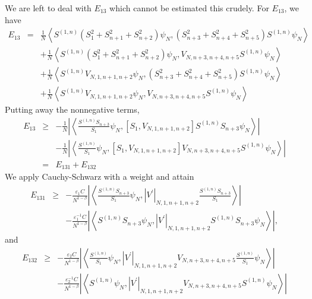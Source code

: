 \documentclass[12pt,letterpaper,leqno]{amsart}
\theoremstyle{plain}
\numberwithin{equation}{section}
\numberwithin{theorem}{section}
\numberwithin{proposition}{section}
\numberwithin{lemma}{section}
\numberwithin{corollary}{section}
\begin{document}
We are left to deal with $E_{13}$ which cannot be estimated this crudely.
For $E_{13}$, we have%
\begin{eqnarray*}
E_{13} &=&\frac{1}{N}\left\langle S^{(1,n)}\left(
S_{1}^{2}+S_{n+1}^{2}+S_{n+2}^{2}\right) \psi _{N},\left(
S_{n+3}^{2}+S_{n+4}^{2}+S_{n+5}^{2}\right) S^{(1,n)}\psi _{N}\right\rangle \\
&&+\frac{1}{N}\left\langle S^{(1,n)}\left(
S_{1}^{2}+S_{n+1}^{2}+S_{n+2}^{2}\right) \psi
_{N},V_{N,n+3,n+4,n+5}S^{(1,n)}\psi _{N}\right\rangle \\
&&+\frac{1}{N}\left\langle S^{(1,n)}V_{N,1,n+1,n+2}\psi _{N},\left(
S_{n+3}^{2}+S_{n+4}^{2}+S_{n+5}^{2}\right) S^{(1,n)}\psi _{N}\right\rangle \\
&&+\frac{1}{N}\left\langle S^{(1,n)}V_{N,1,n+1,n+2}\psi
_{N},V_{N,n+3,n+4,n+5}S^{(1,n)}\psi _{N}\right\rangle
\end{eqnarray*}%
Putting away the nonnegative terms,%
\begin{eqnarray*}
E_{13} &\geqslant &-\frac{1}{N}\left\vert \left\langle \frac{S^{(1,n)}S_{n+3}%
}{S_{1}}\psi _{N},\left[ S_{1},V_{N,1,n+1,n+2}\right] S^{(1,n)}S_{n+3}\psi
_{N}\right\rangle \right\vert \\
&&-\frac{1}{N}\left\vert \left\langle \frac{S^{(1,n)}}{S_{1}}\psi _{N},\left[
S_{1},V_{N,1,n+1,n+2}\right] V_{N,n+3,n+4,n+5}S^{(1,n)}\psi
_{N}\right\rangle \right\vert \\
&=&E_{131}+E_{132}
\end{eqnarray*}%
We apply Cauchy-Schwarz with a weight and attain%
\begin{eqnarray*}
E_{131} &\geqslant &-\frac{\varepsilon _{1}C}{N^{1-\beta }}\left\vert
\left\langle \frac{S^{(1,n)}S_{n+3}}{S_{1}}\psi _{N},\left\vert V^{\prime
}\right\vert _{N,1,n+1,n+2}\frac{S^{(1,n)}S_{n+3}}{S_{1}}\right\rangle
\right\vert \\
&&-\frac{\varepsilon _{1}^{-1}C}{N^{1-\beta }}\left\vert \left\langle
S^{(1,n)}S_{n+3}\psi _{N},\left\vert V^{\prime }\right\vert
_{N,1,n+1,n+2}S^{(1,n)}S_{n+3}\psi _{N}\right\rangle \right\vert ,
\end{eqnarray*}%
and%
\begin{eqnarray*}
E_{132} &\geqslant &-\frac{\varepsilon _{2}C}{N^{1-\beta }}\left\vert
\left\langle \frac{S^{(1,n)}}{S_{1}}\psi _{N},\left\vert V^{\prime
}\right\vert _{N,1,n+1,n+2}V_{N,n+3,n+4,n+5}\frac{S^{(1,n)}}{S_{1}}\psi
_{N}\right\rangle \right\vert \\
&&-\frac{\varepsilon _{2}^{-1}C}{N^{1-\beta }}\left\vert \left\langle
S^{(1,n)}\psi _{N},\left\vert V^{\prime }\right\vert
_{N,1,n+1,n+2}V_{N,n+3,n+4,n+5}S^{(1,n)}\psi _{N}\right\rangle \right\vert
\end{eqnarray*}%
\end{document}
